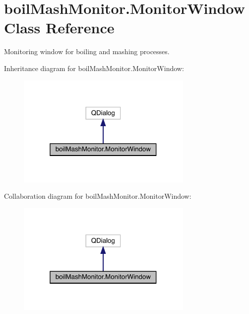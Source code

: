 \hypertarget{classboil_mash_monitor_1_1_monitor_window}{}\section{boil\+Mash\+Monitor.\+Monitor\+Window Class Reference}
\label{classboil_mash_monitor_1_1_monitor_window}


Monitoring window for boiling and mashing processes.  




Inheritance diagram for boil\+Mash\+Monitor.\+Monitor\+Window\+:
\nopagebreak
\begin{figure}[H]
\begin{center}
\leavevmode
\includegraphics[width=241pt]{classboil_mash_monitor_1_1_monitor_window__inherit__graph}
\end{center}
\end{figure}


Collaboration diagram for boil\+Mash\+Monitor.\+Monitor\+Window\+:
\nopagebreak
\begin{figure}[H]
\begin{center}
\leavevmode
\includegraphics[width=241pt]{classboil_mash_monitor_1_1_monitor_window__coll__graph}
\end{center}
\end{figure}
